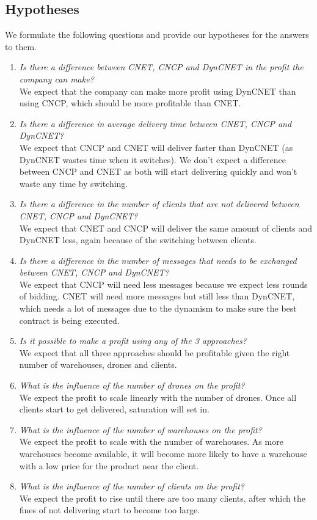 \documentclass[10pt,a4paper,twocolumn]{article}
\begin{document}
\subsection{Hypotheses}
We formulate the following questions and provide our hypotheses for the answers to them.
\begin{enumerate}
\item \textit{Is there a difference between CNET, CNCP and DynCNET in the profit the company can make?} \\
We expect that the company can make more profit using DynCNET than using CNCP, which should be more profitable than CNET.
\item\textit{Is there a difference in average delivery time between CNET, CNCP and DynCNET?} \\
We expect that CNCP and CNET will deliver faster than DynCNET (as DynCNET wastes time when it switches). We don't expect a difference between CNCP and CNET as both will start delivering quickly and won't waste any time by switching.

\item\textit{Is there a difference in the number of clients that are not delivered between CNET, CNCP and DynCNET?} \\
We expect that CNET and CNCP will deliver the same amount of clients and DynCNET less, again because of the switching between clients.

\item\textit{Is there a difference in the number of messages that needs to be exchanged between CNET, CNCP and DynCNET?}\\
We expect that CNCP will need less messages because we expect less rounds of bidding. CNET will need more messages but still less than DynCNET, which needs a lot of messages due to the dynamism to make sure the best contract is being executed. 

\item\textit{Is it possible to make a profit using any of the 3 approaches?}\\
We expect that all three approaches should be profitable given the right number of warehouses, drones and clients.

\item\textit{What is the influence of the number of drones on the profit?}\\
We expect the profit to scale linearly with the number of drones. Once all clients start to get delivered, saturation will set in.

\item\textit{What is the influence of the number of warehouses on the profit?}\\
We expect the profit to scale with the number of warehouses. As more warehouses become available, it will become more likely to have a warehouse with a low price for the product near the client.

\item\textit{What is the influence of the number of clients on the profit?}\\
We expect the profit to rise until there are too many clients, after which the fines of not delivering start to become too large.
\end{enumerate}
\end{document}
